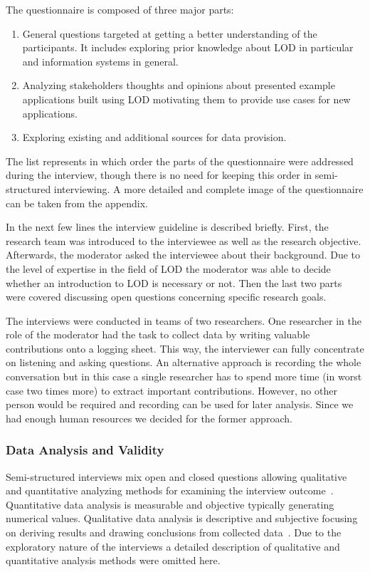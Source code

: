 \documentclass{article}
\begin{document}
The questionnaire is composed of three major parts:
\begin{enumerate}
	\item General questions targeted at getting a better understanding of the participants. It includes exploring prior knowledge about LOD in particular and information systems in general. 
	\item Analyzing stakeholders thoughts and opinions about presented example applications built using LOD motivating them to provide use cases for new applications. 
	\item Exploring existing and additional sources for data provision. 
\end{enumerate}


The list represents in which order the parts of the questionnaire were addressed during the interview, though there is no need for keeping this order in semi-structured interviewing.
A more detailed and complete image of the questionnaire can be taken from the appendix.

In the next few lines the interview guideline is described briefly.
First, the research team was introduced to the interviewee as well as the research objective. Afterwards, the moderator asked the interviewee about their background. Due to the level of expertise in the field of LOD the moderator was able to decide whether an introduction to LOD is necessary or not. Then the last two parts were covered discussing open questions concerning specific research goals.

The interviews were conducted in teams of two researchers. One researcher in the role of the moderator had the task to collect data by writing valuable contributions onto a logging sheet. This way, the interviewer can fully concentrate on listening and asking questions. An alternative approach is recording the whole conversation but in this case a single researcher has to spend more time (in worst case two times more) to extract important contributions. However, no other person would be required and recording can be used for later analysis.
Since we had enough human resources we decided for the former approach. 

\subsubsection{Data Analysis and Validity}
Semi-structured interviews mix open and closed questions allowing qualitative and quantitative analyzing methods for examining the interview outcome~\cite{article:runeson2009-interview-guidelines}. Quantitative data analysis is measurable and objective typically generating numerical values. Qualitative data analysis is descriptive and subjective focusing on deriving results and drawing conclusions from collected data~\cite{article:yin2003case-case-study-research-and-design}. Due to the exploratory nature of the interviews a detailed description of qualitative and quantitative analysis methods were omitted here.  
\end{document}

